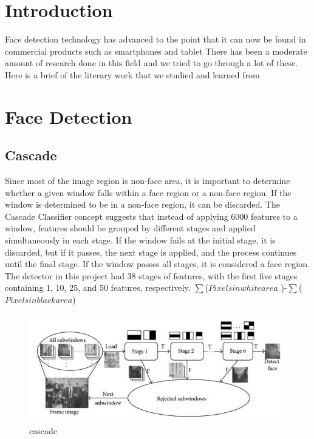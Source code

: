 \section{Introduction}
Face detection technology has advanced to the point that it can now be found in commercial products such as smartphones and tablet
There has been a moderate amount of research done in this field and we tried to go
through a lot of these. Here is a brief of the literary work that we studied and learned from

\section{Face Detection}
\subsection{Cascade}
Since most of the image region is non-face area, it is important to determine whether a given window falls within a face region or a non-face region. If the window is determined to be in a non-face region, it can be discarded. The Cascade Classifier concept suggests that instead of applying 6000 features to a window, features should be grouped by different stages and applied simultaneously in each stage. If the window fails at the initial stage, it is discarded, but if it passes, the next stage is applied, and the process continues until the final stage. If the window passes all stages, it is considered a face region. The detector in this project had 38 stages of features, with the first five stages containing 1, 10, 25, and 50 features, respectively.
\newline  
$  \sum $($Pixels in white area$ )-$\sum$($Pixels in black area$)

\begin{figure}[!htb]
    \centering
    \includegraphics[width=\linewidth,height=0.2\linewidth]{Figures/Ch01/cascade.png}
    \caption{cascade}
    \label{figure:cascade}
    \end{figure}

